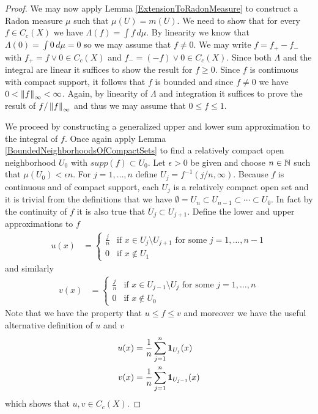\begin{proof}
We may now apply Lemma \ref{ExtensionToRadonMeasure} to construct a
Radon measure $\mu$ such that $\mu(U) = m(U)$.  We need to show that
for every $f \in C_c(X)$ we have $\Lambda(f) = \int f \, d\mu$. By
linearity we know that $\Lambda(0) = \int 0 \, d\mu = 0$ so we may
assume that $f \neq 0$.  We may write $f = f_+
- f_-$ with $f_+ = f \vee 0 \in C_c(X)$ and $f_- = (-f) \vee 0 \in
C_c(X)$.  Since both $\Lambda$ and the integral are linear it suffices
to show the result for $f \geq 0$.  Since $f$ is continuous with
compact support, it follows that $f$ is bounded and since $f \neq 0$
we have $0 < \left \lVert f \right \rVert_\infty < \infty$.  Again, by linearity of
$\Lambda$ and integration it suffices to prove the result of
$f/\left \lVert f \right \rVert_\infty$ and thus we may assume that $0 \leq f \leq 1$.

We proceed by constructing a generalized upper and lower sum
approximation to the integral of $f$.  Once again apply Lemma
\ref{BoundedNeighborhoodsOfCompactSets} to find a relatively compact
open neighborhood $U_0$ with $supp(f) \subset U_0$.  Let $\epsilon >
0$ be given and choose $n \in \mathbb{N}$ such that $\mu(U_0) <
\epsilon n$.  For $j=1, \dotsc, n$ define $U_j = f^{-1} (j/n,
\infty)$.  Because $f$ is continuous and of compact support, each
$U_j$ is a relatively compact open set and it is trivial from the
definitions that we have $\emptyset = U_n \subset U_{n-1} \subset \dotsb \subset
U_0$.  In fact by the continuity of $f$ it is also true that $\overline{U}_j \subset U_{j+1}$.
Define the lower and upper approximations to $f$
\begin{align*}
u(x) &= \begin{cases}
\frac{j}{n} & \text{if $x \in U_j \setminus U_{j+1}$ for some $j=1, \dotsc,  n-1$} \\
0 & \text{if $x \notin U_1$}
\end{cases}
\end{align*}
 and similarly 
\begin{align*}
v(x) &= \begin{cases}
\frac{j}{n} & \text{if $x \in U_{j-1} \setminus U_{j}$ for some
  $j=1,  \dotsc,  n$} \\
0 & \text{if $x \notin U_0$}
\end{cases}
\end{align*}
Note that we have the property that $u \leq f \leq v$ and moreover we
have the useful alternative definition of $u$ and $v$
\begin{align*}
u(x) &= \frac{1}{n} \sum_{j=1}^n \textbf{1}_{U_j}(x) \\
v(x) &= \frac{1}{n} \sum_{j=1}^{n} \textbf{1}_{U_{j-1}}(x) \\
\end{align*}
which shows that $u,v \in C_c(X)$.


\end{proof}

